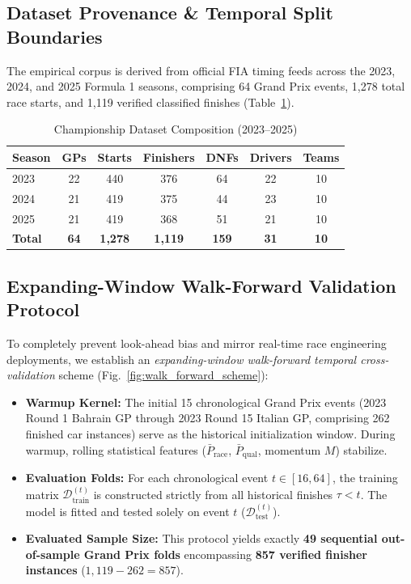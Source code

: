 \documentclass[journal]{IEEEtran}
\begin{document}
\subsection{Dataset Provenance \& Temporal Split Boundaries}
The empirical corpus is derived from official FIA timing feeds across the 2023, 2024, and 2025 Formula 1 seasons, comprising 64 Grand Prix events, 1,278 total race starts, and 1,119 verified classified finishes (Table~\ref{tab:dataset_composition}).

\begin{table}[!htbp]
\centering
\caption{Championship Dataset Composition (2023--2025)}
\label{tab:dataset_composition}
\begin{tabular}{lcccccc}
\toprule
\textbf{Season} & \textbf{GPs} & \textbf{Starts} & \textbf{Finishers} & \textbf{DNFs} & \textbf{Drivers} & \textbf{Teams} \\
\midrule
2023 & 22 & 440 & 376 & 64 & 22 & 10 \\
2024 & 21 & 419 & 375 & 44 & 23 & 10 \\
2025 & 21 & 419 & 368 & 51 & 21 & 10 \\
\midrule
\textbf{Total} & \textbf{64} & \textbf{1,278} & \textbf{1,119} & \textbf{159} & \textbf{31} & \textbf{10} \\
\bottomrule
\end{tabular}
\end{table}

\subsection{Expanding-Window Walk-Forward Validation Protocol}
To completely prevent look-ahead bias and mirror real-time race engineering deployments, we establish an \textit{expanding-window walk-forward temporal cross-validation} scheme (Fig.~\ref{fig:walk_forward_scheme}):
\begin{itemize}
    \item \textbf{Warmup Kernel:} The initial 15 chronological Grand Prix events (2023 Round 1 Bahrain GP through 2023 Round 15 Italian GP, comprising 262 finished car instances) serve as the historical initialization window. During warmup, rolling statistical features ($\bar{P}_{\text{race}}$, $\bar{P}_{\text{qual}}$, momentum $M$) stabilize.
    \item \textbf{Evaluation Folds:} For each chronological event $t \in [16, 64]$, the training matrix $\mathcal{D}_{\text{train}}^{(t)}$ is constructed strictly from all historical finishes $\tau < t$. The model is fitted and tested solely on event $t$ ($\mathcal{D}_{\text{test}}^{(t)}$).
    \item \textbf{Evaluated Sample Size:} This protocol yields exactly \textbf{49 sequential out-of-sample Grand Prix folds} encompassing \textbf{857 verified finisher instances} ($1,119 - 262 = 857$).
\end{itemize}
\end{document}
